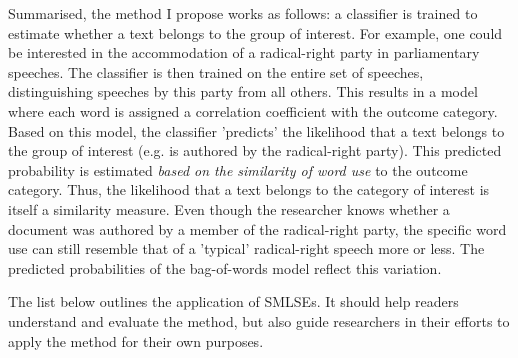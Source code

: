\documentclass{article}
\begin{document}
Summarised, the method I propose works as follows: a classifier is trained to estimate whether a text belongs to the group of interest. For example, one could be interested in the accommodation of a radical-right party in parliamentary speeches. The classifier is then trained on the entire set of speeches, distinguishing speeches by this party from all others. This results in a model where each word is assigned a correlation coefficient with the outcome category. Based on this model, the classifier 'predicts' the likelihood that a text belongs to the group of interest (e.g. is authored by the radical-right party). This predicted probability is estimated \textit{based on the similarity of word use} to the outcome category. Thus, the likelihood that a text belongs to the category of interest is itself a similarity measure. Even though the researcher knows whether a document was authored by a member of the radical-right party, the specific word use can still resemble that of a 'typical' radical-right speech more or less. The predicted probabilities of the bag-of-words model reflect this variation. \par


The list below outlines the application of SMLSEs. It should help readers understand and evaluate the method, but also guide researchers in their efforts to apply the method for their own purposes. \medskip
\end{document}
